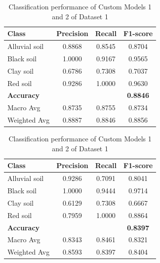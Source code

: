 \documentclass[conference]{IEEEtran}
\begin{document}
\begin{table}[htbp]
    \centering

    \begin{subtable}{\columnwidth}
        \centering
        \begin{tabular}{lccc}
            \toprule
            \textbf{Class} & \textbf{Precision} & \textbf{Recall} & \textbf{F1-score} \\
            \midrule
            Alluvial soil & 0.8868 & 0.8545 & 0.8704 \\
            Black soil    & 1.0000 & 0.9167 & 0.9565 \\
            Clay soil     & 0.6786 & 0.7308 & 0.7037 \\
            Red soil      & 0.9286 & 1.0000 & 0.9630 \\
            \midrule
            \textbf{Accuracy} & & & \textbf{0.8846} \\
            Macro Avg     & 0.8735 & 0.8755 & 0.8734 \\
            Weighted Avg  & 0.8887 & 0.8846 & 0.8856 \\
            \bottomrule
        \end{tabular}
        \caption{Classification Report of Custom Model 1}
    \end{subtable}

    \vspace{5pt}

    \begin{subtable}{\columnwidth}
        \centering
        \begin{tabular}{lccc}
            \toprule
            \textbf{Class} & \textbf{Precision} & \textbf{Recall} & \textbf{F1-score} \\
            \midrule
            Alluvial soil & 0.9286 & 0.7091 & 0.8041 \\
            Black soil    & 1.0000 & 0.9444 & 0.9714 \\
            Clay soil     & 0.6129 & 0.7308 & 0.6667 \\
            Red soil      & 0.7959 & 1.0000 & 0.8864 \\
            \midrule
            \textbf{Accuracy} & & & \textbf{0.8397} \\
            Macro Avg     & 0.8343 & 0.8461 & 0.8321 \\
            Weighted Avg  & 0.8593 & 0.8397 & 0.8404 \\
            \bottomrule
        \end{tabular}
        \caption{Classification Report of Custom Model 2}
    \end{subtable}

    \caption{Classification performance of Custom Models 1 and 2 of Dataset 1}
    \label{tab:overall_performance}
\end{table}
\end{document}
